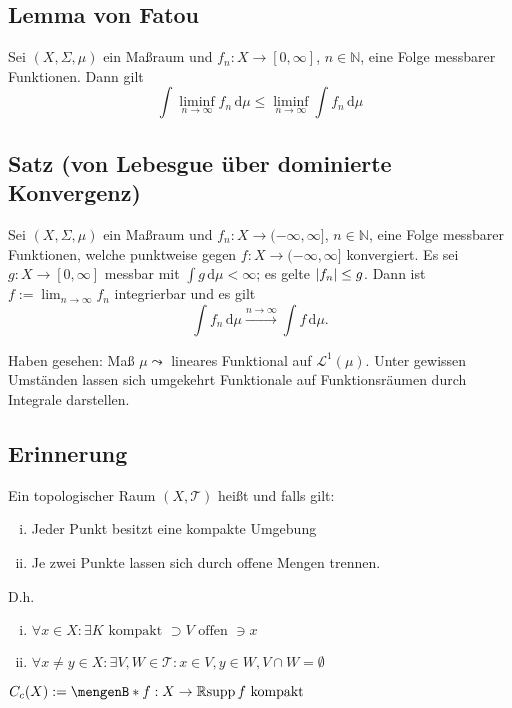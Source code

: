\subsection{Lemma von Fatou} %
\label{sub:923}
Sei $(X, \Sigma, \mu)$ ein Maßraum und $f_n : X \to  [0,\infty]$, $n \in \mathds{N}$, eine Folge messbarer Funktionen. Dann gilt 
\[
	\int\! \liminf_{n \to \infty} f_n  \, \mathrm{d}\mu \le \liminf_{n \to \infty} \int\! f_n  \, \mathrm{d}\mu
\]

\subsection{Satz (von Lebesgue über dominierte Konvergenz)} %
\label{sub:924}
Sei $(X, \Sigma,  \mu)$ ein Maßraum und $f_n : X \to (-\infty,\infty]$, $n \in \mathds{N} $, eine Folge messbarer Funktionen, welche punktweise gegen 
$f : X  \to (-\infty, \infty]$ konvergiert. Es sei $g : X \to [0,\infty]$ messbar mit $\int\! g  \, \mathrm{d}\mu < \infty$; es gelte $\lvert f_n\rvert \le g $.
Dann ist $f := \lim_{ n \to \infty} f_n$ integrierbar und es gilt
\[
	\int\! f_n  \, \mathrm{d}\mu \xrightarrow{n \to \infty} \int\! f  \, \mathrm{d}\mu.
\]

Haben gesehen: Maß $\mu \leadsto$ lineares Funktional auf $\mathcal{L}^1(\mu)$. Unter gewissen Umständen lassen sich umgekehrt Funktionale auf Funktionsräumen durch Integrale
darstellen.

\subsection*{Erinnerung} %
\label{sub:erinnerung}
Ein topologischer Raum $(X, \mathcal{T} )$ heißt  und  falls gilt:
\begin{enumerate}[(i)]
	\item Jeder Punkt besitzt eine kompakte Umgebung
	\item Je zwei Punkte lassen sich durch offene Mengen trennen.
\end{enumerate}
D.h. 
\begin{enumerate}[(i)]
	\item $\forall x \in X : \exists K \text{ kompakt }\supset V \text{ offen } \ni x$
	\item $\forall x \not= y \in X : \exists V,W \in \mathcal{T}: x \in V, y \in W, V \cap W = \emptyset$
\end{enumerate} 
$C_c(X) := \set[f : X \to \mathds{R}]{\supp f \text{ kompakt}} $ 

